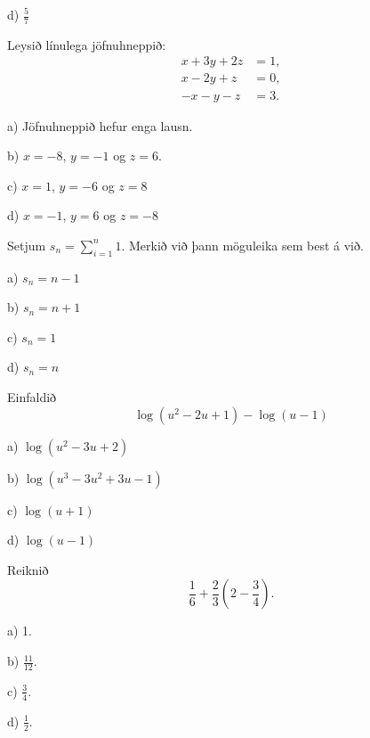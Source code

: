 d) \hspace{2mm} $\displaystyle\frac{5}{7}$ %


\item Leysið línulega jöfnuhneppið:
\begin{align*}
x + 3y + 2z &= 1, \\
x - 2y + z &= 0, \\
-x - y - z &= 3.
\end{align*}

a) Jöfnuhneppið hefur enga lausn.

b) $x = -8$, $y = -1$ og $z = 6$. %

c) $x = 1$, $y = -6$ og $z = 8$

d) $x = -1$, $y = 6$ og $z = -8$


\item Setjum $s_n = \sum_{i=1}^n 1$. Merkið við þann möguleika sem best á við.
\newpage

a) $s_n = n-1$

b) $s_n = n+1$

c) $s_n = 1$

d) $s_n = n$ %


\item Einfaldið
$$\log(u^2-2u+1)-\log(u-1)$$

a) $\log(u^2-3u+2)$

b) $\log(u^3-3u^2+3u-1)$

c) $\log(u+1)$

d) $\log(u-1)$ %


\item Reiknið
\[
\frac{1}{6} + \frac{2}{3} \left( 2 - \frac{3}{4} \right).
\]

a) 1. %

b) $ \frac{11}{12}$.

c) $ \frac{3}{4}$.

d) $ \frac{1}{2}$.


